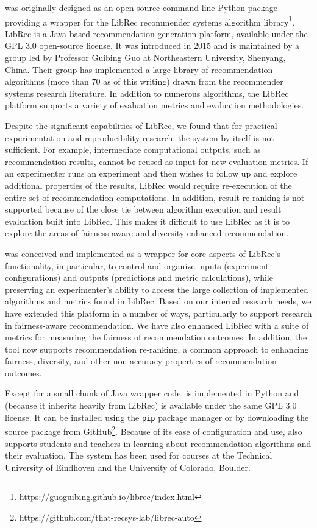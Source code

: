 \libauto{} was originally designed as an open-source command-line Python package providing a wrapper for the LibRec recommender systems algorithm library\footnote{https://guoguibing.github.io/librec/index.html}. LibRec is a Java-based recommendation generation platform, available under the GPL 3.0 open-source license. It was introduced in 2015 \cite{guo2015librec} and is maintained by a group led by Professor Guibing Guo at Northeastern University, Shenyang, China. Their group has implemented a large library of recommendation algorithms (more than 70 as of this writing) drawn from the recommender systems research literature. In addition to numerous algorithms, the LibRec platform supports a variety of evaluation metrics and evaluation methodologies.

Despite the significant capabilities of LibRec, we found that for practical experimentation and reproducibility research, the system by itself is not sufficient. For example, intermediate computational outputs, such as recommendation results, cannot be reused as input for new evaluation metrics. If an experimenter runs an experiment and then wishes to follow up and explore additional properties of the results, LibRec would require re-execution of the entire set of recommendation computations. In addition, result re-ranking is not supported because of the close tie between algorithm execution and result evaluation built into LibRec. This makes it difficult to use LibRec as it is to explore the areas of fairness-aware and diversity-enhanced recommendation.

\libauto{} was conceived and implemented as a wrapper for core aspects of LibRec's functionality, in particular, to control and organize inputs (experiment configurations) and outputs (predictions and metric calculations), while preserving an experimenter's ability to access the large collection of implemented algorithms and metrics found in LibRec. Based on our internal research needs, we have extended this platform in a number of ways, particularly to support research in fairness-aware recommendation. We have also enhanced LibRec with a suite of metrics for measuring the fairness of recommendation outcomes. In addition, the tool now supports recommendation re-ranking, a common approach to enhancing fairness, diversity, and other non-accuracy properties of recommendation outcomes.

Except for a small chunk of Java wrapper code, \libauto{} is implemented in Python and (because it inherits heavily from LibRec) is available under the same GPL 3.0 license. It can be installed using the \texttt{pip} package manager or by downloading the source package from GitHub\footnote{https://github.com/that-recsys-lab/librec-auto}. Because of its ease of configuration and use, \libauto{} also supports students and teachers in learning about recommendation algorithms and their evaluation. The system has been used for courses at the Technical University of Eindhoven and the University of Colorado, Boulder. 

